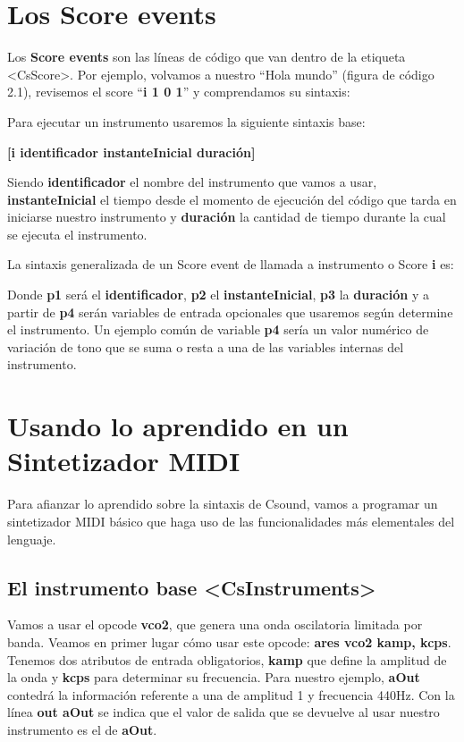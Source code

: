 \section{Los Score events}\label{sec:scores}

Los \textbf{Score events} son las líneas de código que van dentro de la etiqueta \textless CsScore\textgreater. Por ejemplo, volvamos a nuestro ``Hola mundo'' (figura de código 2.1), revisemos el score ``\textbf{i 1 0 1}'' y comprendamos su sintaxis: 

Para ejecutar un instrumento usaremos la siguiente sintaxis base: \bigskip

\textbf{[i identificador instanteInicial duración]}\bigskip

 Siendo \textbf{identificador} el nombre del instrumento que vamos a usar, \textbf{instanteInicial} el tiempo desde el momento de ejecución del código que tarda en iniciarse nuestro instrumento y \textbf{duración} la cantidad de tiempo durante la cual se ejecuta el instrumento.
 
 La sintaxis generalizada de un Score event de llamada a instrumento o Score \textbf{i} es:
 
 
Donde \textbf{p1} será el \textbf{identificador}, \textbf{p2} el \textbf{instanteInicial}, \textbf{p3} la \textbf{duración} y a partir de \textbf{p4} serán variables de entrada opcionales que usaremos según determine el instrumento. Un ejemplo común de variable \textbf{p4} sería un valor numérico de variación de tono que se suma o resta a una de las variables internas del instrumento.

\section{Usando lo aprendido en un Sintetizador MIDI}\label{sec:usandoAprendido}

Para afianzar lo aprendido sobre la sintaxis de Csound, vamos a programar un sintetizador MIDI básico que haga uso de las funcionalidades más elementales del lenguaje.

\subsection{El instrumento base \textless CsInstruments\textgreater}\label{sec:instSinte}

Vamos a usar el opcode \textbf{vco2}, que genera una onda oscilatoria limitada por banda. Veamos en primer lugar cómo usar este opcode: \textbf{ares vco2 kamp, kcps}. Tenemos dos atributos de entrada obligatorios, \textbf{kamp} que define la amplitud de la onda y \textbf{kcps} para determinar su frecuencia.
Para nuestro ejemplo, \textbf{aOut} contedrá la información referente a una de amplitud 1 y frecuencia 440Hz. Con la línea \textbf{out aOut} se indica que el valor de salida que se devuelve al usar nuestro instrumento es el de \textbf{aOut}.


